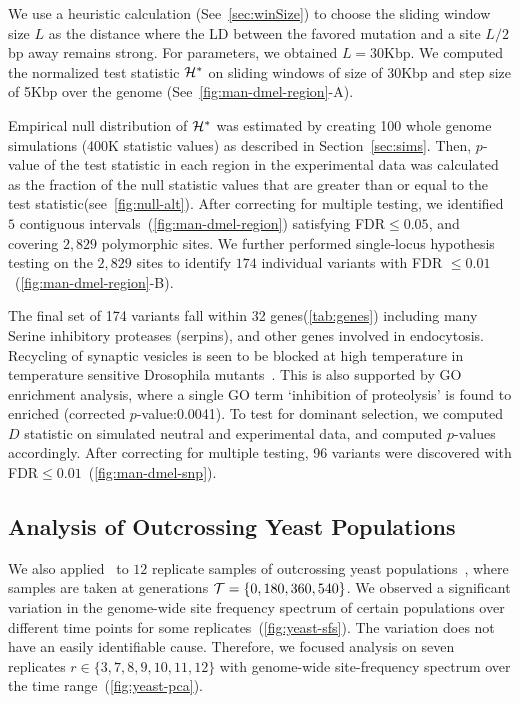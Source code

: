 \documentclass[9pt,twocolumn,twoside]{gsajnl}
\begin{document}
We use a heuristic calculation (See~\ref{sec:winSize}) to choose the
sliding window size $L$ as the distance where the LD between the
favored mutation and a site $L/2$bp away remains strong. For \dmel
parameters, we obtained $L=30$Kbp. We computed the normalized test
statistic ${\cal H}^*$ on sliding windows of size of 30Kbp and step size of
5Kbp over the genome (See~\ref{fig:man-dmel-region}-A).

Empirical null distribution of ${\cal H}^*$ was estimated by creating 100
whole genome simulations (400K statistic values) as described in
Section~\ref{sec:sims}. Then, $p$-value of the test statistic in each
region in the experimental data was calculated as the fraction of the
null statistic values that are greater than or equal to the test
statistic(see~\ref{fig:null-alt}).  After correcting for multiple
testing, we identified $5$ contiguous
intervals~(\ref{fig:man-dmel-region}) satisfying FDR$\le0.05$, and
covering $2,829$ polymorphic sites. We further performed single-locus
hypothesis testing on the $2,829$ sites to identify $174$ individual
variants with FDR $\le0.01$~(\ref{fig:man-dmel-region}-B).

The final set of 174 variants fall within 32 genes(\ref{tab:genes})
including many Serine inhibitory proteases (serpins), and other genes
involved in endocytosis. Recycling of synaptic vesicles is seen to be
blocked at high temperature in temperature sensitive Drosophila
mutants~\cite{kosaka1983reversible}. This is also supported by GO
enrichment analysis, where a single GO term `inhibition of
proteolysis' is found to enriched (corrected $p$-value:0.0041).  To
test for dominant selection, we computed $D$ statistic on simulated
neutral and experimental data, and computed $p$-values accordingly.
After correcting for multiple testing, 96 variants were discovered
with FDR$\le 0.01$~(\ref{fig:man-dmel-snp}). 


\subsection{Analysis of Outcrossing Yeast Populations}
We also applied \comale\ to  $12$ replicate samples of
outcrossing yeast populations~\cite{burke2014standing}, where samples are 
taken at
generations ${\cal T}=\{0,180,360,540\}$. We observed a significant
variation in the genome-wide site frequency spectrum of certain
populations over different time points for some
replicates~(\ref{fig:yeast-sfs}). The variation does not have an
easily identifiable cause. Therefore, we focused analysis on seven
replicates $r\in\{3,7,8,9,10,11,12\}$ with genome-wide site-frequency
spectrum over the time range~(\ref{fig:yeast-pca}).
\end{document}
